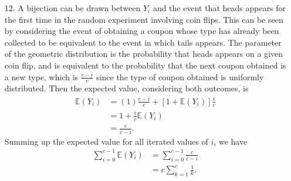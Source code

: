\documentclass[a4paper,12pt]{article}
\begin{document}
\begin{enumerate}
    \item[12.]
        A bijection can be drawn between $Y_i$ and the event that heads appears for the first time in the random experiment involving coin flips. This can be seen by considering the event of obtaining a coupon whose type has already been collected to be equivalent to the event in which tails appears. The parameter of the geometric distribution is the probability that heads appears on a given coin flip, and is equivalent to the probability that the next coupon obtained is a new type, which is $\frac{c - i}{c}$ since the type of coupon obtained is uniformly distributed. Then the expected value, considering both outcomes, is
        \begin{align*}
            \mathbb{E}(Y_i) &= (1) \frac{c - i}{c} + [1 + \mathbb{E}(Y_i)] \frac{i}{c} \\
            &= 1 + \frac{i}{c} \mathbb{E}(Y_i) \\
            &= \frac{c}{c - i}.
        \end{align*}
        Summing up the expected value for all iterated values of $i$, we have
        \begin{align*}
            \sum_{i = 0}^{c - 1} \mathbb{E}(Y_i) &= \sum_{i = 0}^{c - 1} \frac{c}{c - i} \\
            &= c \sum_{k = 1}^{c} \frac{1}{k}.
        \end{align*}
\end{enumerate}
\end{document}
